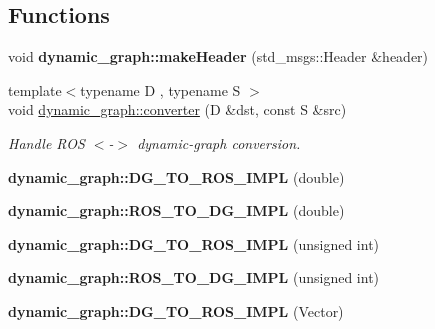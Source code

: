 \subsection*{Functions}
\begin{DoxyCompactItemize}
\item 
void {\bfseries dynamic\+\_\+graph\+::make\+Header} (std\+\_\+msgs\+::\+Header \&header)\hypertarget{namespacedynamic__graph_a7932709c47f2977a4478bd6f035ee12b}{}\label{namespacedynamic__graph_a7932709c47f2977a4478bd6f035ee12b}

\item 
{\footnotesize template$<$typename D , typename S $>$ }\\void \hyperlink{namespacedynamic__graph_aa00932c9efb8a607efd6997386d78680}{dynamic\+\_\+graph\+::converter} (D \&dst, const S \&src)
\begin{DoxyCompactList}\small\item\em Handle R\+OS $<$-\/$>$ dynamic-\/graph conversion. \end{DoxyCompactList}\item 
{\bfseries dynamic\+\_\+graph\+::\+D\+G\+\_\+\+T\+O\+\_\+\+R\+O\+S\+\_\+\+I\+M\+PL} (double)\hypertarget{namespacedynamic__graph_a22ff0d85472d1b606719f789a73224c3}{}\label{namespacedynamic__graph_a22ff0d85472d1b606719f789a73224c3}

\item 
{\bfseries dynamic\+\_\+graph\+::\+R\+O\+S\+\_\+\+T\+O\+\_\+\+D\+G\+\_\+\+I\+M\+PL} (double)\hypertarget{namespacedynamic__graph_a8487bee8650edee2dabb3c21662f411f}{}\label{namespacedynamic__graph_a8487bee8650edee2dabb3c21662f411f}

\item 
{\bfseries dynamic\+\_\+graph\+::\+D\+G\+\_\+\+T\+O\+\_\+\+R\+O\+S\+\_\+\+I\+M\+PL} (unsigned int)\hypertarget{namespacedynamic__graph_a894a6396a849e5a251f807e42f160c28}{}\label{namespacedynamic__graph_a894a6396a849e5a251f807e42f160c28}

\item 
{\bfseries dynamic\+\_\+graph\+::\+R\+O\+S\+\_\+\+T\+O\+\_\+\+D\+G\+\_\+\+I\+M\+PL} (unsigned int)\hypertarget{namespacedynamic__graph_afd65ab6689e1cc46f28c0c6e365f0ff6}{}\label{namespacedynamic__graph_afd65ab6689e1cc46f28c0c6e365f0ff6}

\item 
{\bfseries dynamic\+\_\+graph\+::\+D\+G\+\_\+\+T\+O\+\_\+\+R\+O\+S\+\_\+\+I\+M\+PL} (Vector)\hypertarget{namespacedynamic__graph_ac2a5616ba0bc2168c574b16fb4512b1c}{}\label{namespacedynamic__graph_ac2a5616ba0bc2168c574b16fb4512b1c}


\end{DoxyCompactItemize}
